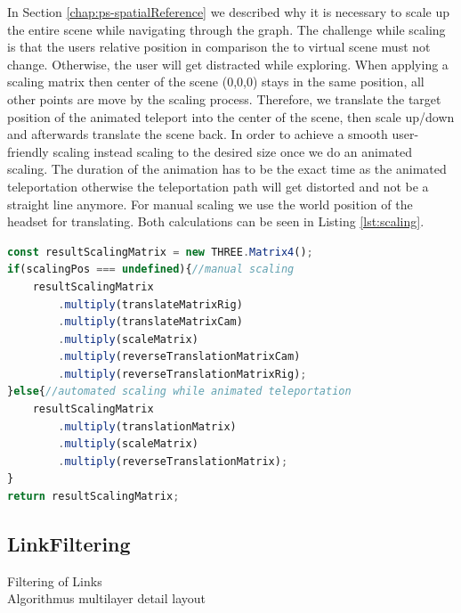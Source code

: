 In Section \ref{chap:ps-spatialReference} we described why it is necessary to scale up the entire scene while navigating through the graph. 
The challenge while scaling is that the users relative position in comparison the to virtual scene must not change. Otherwise, the user will get distracted while exploring.
When applying a scaling matrix then center of the scene (0,0,0) stays in the same position, all other points are move by the scaling process. 
Therefore, we translate the target position of the animated teleport into the center of the scene, then scale up/down and afterwards translate the scene back.
In order to achieve a smooth user-friendly scaling instead scaling to the desired size once we do an animated scaling. The duration of the animation has to be the exact time as the animated teleportation otherwise the teleportation path will get distorted and not be a straight line anymore.
For manual scaling we use the world position of the headset for translating. Both calculations can be seen in Listing \ref{lst:scaling}.

\begin{lstlisting}[language=JavaScript,label={lst:scaling},caption=Simplified algorithm for calculating the scaling matrix]
const resultScalingMatrix = new THREE.Matrix4();
if(scalingPos === undefined){//manual scaling
    resultScalingMatrix
        .multiply(translateMatrixRig)
        .multiply(translateMatrixCam)
        .multiply(scaleMatrix)
        .multiply(reverseTranslationMatrixCam)
        .multiply(reverseTranslationMatrixRig);
}else{//automated scaling while animated teleportation
    resultScalingMatrix
        .multiply(translationMatrix)
        .multiply(scaleMatrix)
        .multiply(reverseTranslationMatrix);
}
return resultScalingMatrix;
\end{lstlisting}

\subsection{LinkFiltering}
\label{sec:linkFiltering}

Filtering of Links\\
Algorithmus multilayer detail layout\\
